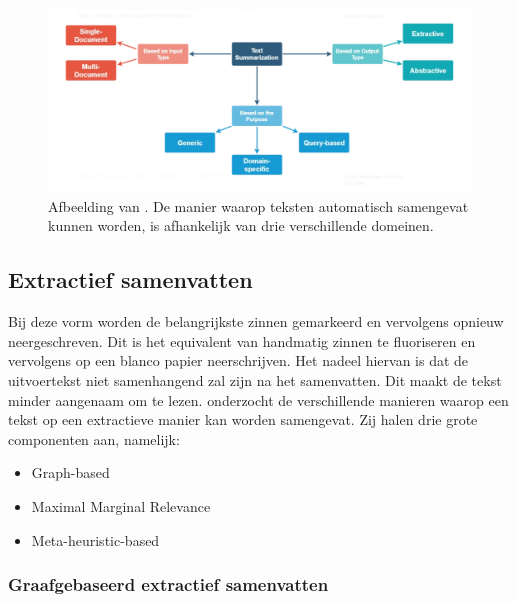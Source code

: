 \begin{figure}
	\includegraphics{img/summarization-mindmap.png}
	\caption{Afbeelding van \textcite{Chauchan2018}. De manier waarop teksten automatisch samengevat kunnen worden, is afhankelijk van drie verschillende domeinen.}
\end{figure}

\subsection{Extractief samenvatten}

Bij deze vorm worden de belangrijkste zinnen gemarkeerd en vervolgens opnieuw neergeschreven.  Dit is het equivalent van handmatig zinnen te fluoriseren en vervolgens op een blanco papier neerschrijven. Het nadeel hiervan is dat de uitvoertekst niet samenhangend zal zijn na het samenvatten. Dit maakt de tekst minder aangenaam om te lezen. \textcite{Verma2020} onderzocht de verschillende manieren waarop een tekst op een extractieve manier kan worden samengevat. Zij halen drie grote componenten aan, namelijk:

\begin{itemize}
	\item Graph-based
	\item Maximal Marginal Relevance
	\item Meta-heuristic-based
\end{itemize}


\subsubsection{Graafgebaseerd extractief samenvatten}

